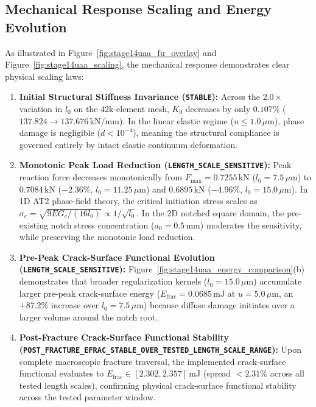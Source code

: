 \subsection{Mechanical Response Scaling and Energy Evolution}
\label{subsec:stage14uaa_mechanical_scaling}

As illustrated in Figure~\ref{fig:stage14uaa_fu_overlay} and Figure~\ref{fig:stage14uaa_scaling}, the mechanical response demonstrates clear physical scaling laws:
\begin{enumerate}
  \item \textbf{Initial Structural Stiffness Invariance (\texttt{STABLE}):} Across the $2.0\times$ variation in $l_0$ on the 42k-element mesh, $K_0$ decreases by only $0.107\%$ ($137.824 \to 137.676\,\mathrm{kN/mm}$). In the linear elastic regime ($u \le 1.0\,\mu\mathrm{m}$), phase damage is negligible ($d < 10^{-4}$), meaning the structural compliance is governed entirely by intact elastic continuum deformation.
  \item \textbf{Monotonic Peak Load Reduction (\texttt{LENGTH\_SCALE\_SENSITIVE}):} Peak reaction force decreases monotonically from $F_{\max} = 0.7255\,\mathrm{kN}$ ($l_0 = 7.5\,\mu\mathrm{m}$) to $0.7084\,\mathrm{kN}$ ($-2.36\%$, $l_0 = 11.25\,\mu\mathrm{m}$) and $0.6895\,\mathrm{kN}$ ($-4.96\%$, $l_0 = 15.0\,\mu\mathrm{m}$). In 1D AT2 phase-field theory, the critical initiation stress scales as $\sigma_c = \sqrt{9 E G_c / (16 l_0)} \propto 1/\sqrt{l_0}$. In the 2D notched square domain, the pre-existing notch stress concentration ($a_0 = 0.5\,\mathrm{mm}$) moderates the sensitivity, while preserving the monotonic load reduction.
  \item \textbf{Pre-Peak Crack-Surface Functional Evolution (\texttt{LENGTH\_SCALE\_SENSITIVE}):} Figure~\ref{fig:stage14uaa_energy_comparison}(b) demonstrates that broader regularization kernels ($l_0 = 15.0\,\mu\mathrm{m}$) accumulate larger pre-peak crack-surface energy ($E_{\mathrm{frac}} = 0.0685\,\mathrm{mJ}$ at $u = 5.0\,\mu\mathrm{m}$, an $+87.2\%$ increase over $l_0 = 7.5\,\mu\mathrm{m}$) because diffuse damage initiates over a larger volume around the notch root.
  \item \textbf{Post-Fracture Crack-Surface Functional Stability (\texttt{POST\_FRACTURE\_EFRAC\_STABLE\_OVER\_TESTED\_LENGTH\_SCALE\_RANGE}):} Upon complete macroscopic fracture traversal, the implemented crack-surface functional evaluates to $E_{\mathrm{frac}} \in [2.302, 2.357]\,\mathrm{mJ}$ (spread $< 2.31\%$ across all tested length scales), confirming physical crack-surface functional stability across the tested parameter window.
\end{enumerate}

